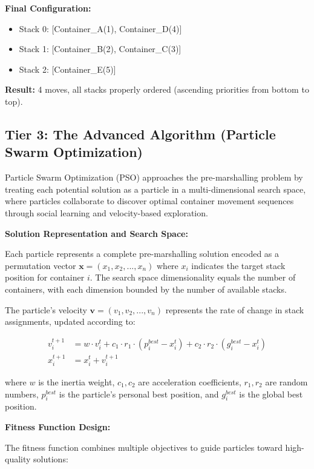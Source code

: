 \documentclass{article}
\begin{document}
\textbf{Final Configuration:}
\begin{itemize}
\item Stack 0: [Container\_A(1), Container\_D(4)]
\item Stack 1: [Container\_B(2), Container\_C(3)]
\item Stack 2: [Container\_E(5)]
\end{itemize}

\textbf{Result:} 4 moves, all stacks properly ordered (ascending priorities from bottom to top).

\subsection{Tier 3: The Advanced Algorithm (Particle Swarm Optimization)}

Particle Swarm Optimization (PSO) approaches the pre-marshalling problem by treating each potential solution as a particle in a multi-dimensional search space, where particles collaborate to discover optimal container movement sequences through social learning and velocity-based exploration.

\textbf{Solution Representation and Search Space:}

Each particle represents a complete pre-marshalling solution encoded as a permutation vector $\mathbf{x} = (x_1, x_2, ..., x_n)$ where $x_i$ indicates the target stack position for container $i$. The search space dimensionality equals the number of containers, with each dimension bounded by the number of available stacks.

The particle's velocity $\mathbf{v} = (v_1, v_2, ..., v_n)$ represents the rate of change in stack assignments, updated according to:

\begin{align}
v_{i}^{t+1} &= w \cdot v_{i}^{t} + c_1 \cdot r_1 \cdot (p_{i}^{best} - x_{i}^{t}) + c_2 \cdot r_2 \cdot (g_{i}^{best} - x_{i}^{t}) \\
x_{i}^{t+1} &= x_{i}^{t} + v_{i}^{t+1}
\end{align}

where $w$ is the inertia weight, $c_1, c_2$ are acceleration coefficients, $r_1, r_2$ are random numbers, $p_{i}^{best}$ is the particle's personal best position, and $g_{i}^{best}$ is the global best position.

\textbf{Fitness Function Design:}

The fitness function combines multiple objectives to guide particles toward high-quality solutions:
\end{document}
